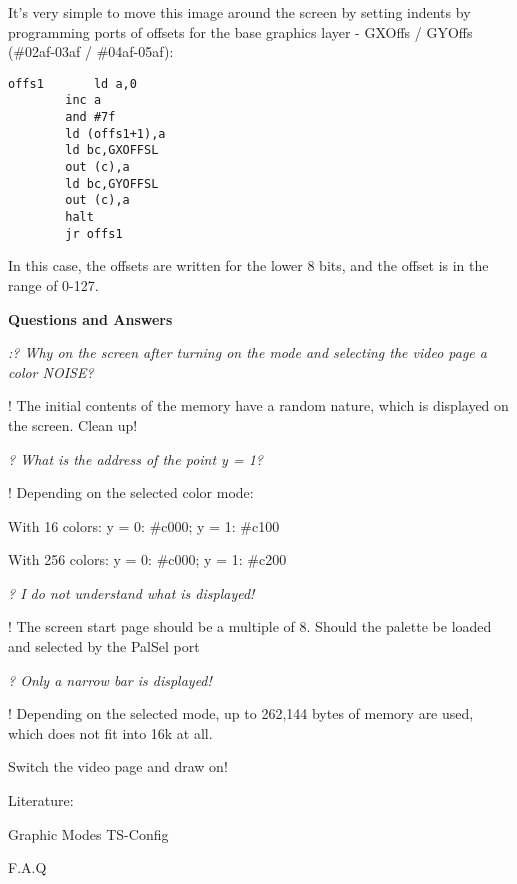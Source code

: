 \documentclass{article}
\begin{document}
It’s very simple to move this image around the screen by setting
indents by programming ports of offsets for the base graphics layer -
GXOffs / GYOffs (\#02af-03af / \#04af-05af):

\begin{verbatim}
offs1		ld a,0
		inc a
		and #7f
		ld (offs1+1),a
		ld bc,GXOFFSL
		out (c),a
		ld bc,GYOFFSL
		out (c),a
		halt
		jr offs1
\end{verbatim}

In this case, the offsets are written for the lower 8 bits, and the
offset is in the range of 0-127.

\textbf{Questions and Answers }

\emph{:? Why on the screen after turning on the mode and selecting the
  video page a color NOISE? }

! The initial contents of the memory have a random nature, which is
displayed on the screen. Clean up!

\emph{? What is the address of the point y = 1? }

! Depending on the selected color mode:

With 16 colors: y = 0: \#c000; y = 1: \#c100

With 256 colors: y = 0: \#c000; y = 1: \#c200

\emph{? I do not understand what is displayed! }

! The screen start page should be a multiple of 8. Should the palette
be loaded and selected by the PalSel port

\emph{? Only a narrow bar is displayed!}

! Depending on the selected mode, up to 262,144 bytes of memory are
used, which does not fit into 16k at all.

Switch the video page and draw on!

Literature:

Graphic Modes TS-Config

F.A.Q
\end{document}
